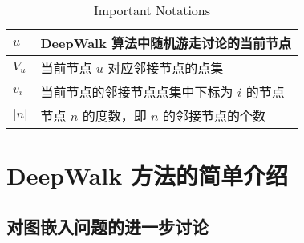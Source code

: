 \documentclass{ctexart}
\begin{document}
\begin{table}[!t]
\renewcommand{\arraystretch}{1.1}
\caption{Important Notations}
\label{notations}
\centering
\begin{tabular}{|l|p{}|}
    \hline
    \(u\) & DeepWalk 算法中随机游走讨论的当前节点 \\
    \hline
    \(V_u\) & 当前节点 \(u\) 对应邻接节点的点集 \\
    \hline
    \(v_i\) & 当前节点的邻接节点点集中下标为 \(i\) 的节点 \\
    \hline
    \(|n|\) & 节点 \(n\) 的度数，即 \(n\) 的邻接节点的个数 \\
    \hline
\end{tabular}
\end{table}

\section{DeepWalk 方法的简单介绍}

\subsection{对图嵌入问题的进一步讨论}
\end{document}
